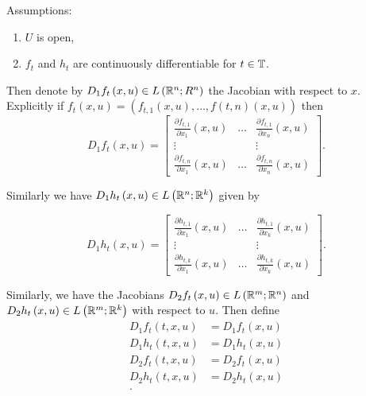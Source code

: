 Assumptions: 
\begin{enumerate}
	\item $U$ is open, 
	\item  $f_{t}$ and $h_t$ are continuously differentiable for $t \in  \mathbb{T} $.
\end{enumerate}

Then denote by $D_{1}f_{t}\left( x, u \right) \in L\left( \mathbb{R} ^{n}; R^{n} \right) $ the Jacobian with respect to $x$. Explicitly if $f_{t}\left( x, u \right) = \left( f_{t, 1}\left( x, u \right) , \ldots, f\left( t, n  \right) \left( x, u \right)  \right)  $ then 
\[
	D_1 f_t\left( x, u \right) = \begin{bmatrix} \frac{\partial f_{t, 1}}{\partial x_1} \left( x, u \right) & \ldots & \frac{\partial f_{t, 1}}{\partial x_{n}} \left( x, u \right) \\
	\vdots & & \vdots \\
\frac{\partial f_{t, n }}{\partial x_1}\left( x, u \right)   & \ldots & \frac{\partial f_{t, n}}{\partial x_{n}} \left( x, u \right) \end{bmatrix} 
.\] 

Similarly we have $D_1 h_{t}\left( x, u \right) \in L\left( \mathbb{R}^{n }; \mathbb{R}^{k} \right) $ given by 

\[
	D_1 h_t\left( x, u \right) = \begin{bmatrix} 
		\frac{\partial h_{t, 1}}{\partial x_1} \left( x, u \right) & \ldots & \frac{\partial h_{t, 1}}{\partial x_{k}} \left( x, u \right) \\
	\vdots & & \vdots \\
\frac{\partial h_{t, k }}{\partial x_1}\left( x, u \right)   & \ldots & \frac{\partial h_{t, k}}{\partial x_{k}} \left( x, u \right) \end{bmatrix} 
.\] 

Similarly, we have the Jacobians $D_2 f_{t}\left( x, u  \right) \in  L\left( \mathbb{R}^{m}; \mathbb{R}^{n} \right) $ and $D_{2}h _{t}\left( x, u \right) \in L\left( \mathbb{R} ^{m }; \mathbb{R} ^{k} \right) $ with respect to $u$. Then define 
 \begin{align*}
	 D_1 f_{t}\left( t, x, u \right) &= D_1 f_{t}\left( x, u \right)  \\
	 D_1 h_{t}\left( t, x, u \right) &= D_1 h_{t}\left( x, u \right)  \\
	 D_2 f_{t}\left( t, x, u \right) &= D_2 f_{t}\left( x, u \right)  \\
	 D_2 h_{t}\left( t, x, u \right) &= D_2 h_{t}\left( x, u \right)  \\
.\end{align*}


